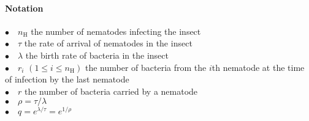 \documentclass{article}
\newcommand{\nN}{{n_\textrm{H}}}
\begin{document}
 \paragraph{Notation} $ $\\
 $\bullet \quad \nN$ the number of nematodes infecting the insect\\
 $\bullet \quad \tau$ the rate of arrival of nematodes in the insect\\
 $\bullet \quad \lambda$ the birth rate of bacteria in the insect\\
 $\bullet \quad r_i$ $( 1 \leq i \leq \nN )$ the number of bacteria from the $i$th nematode at the time of infection by the last nematode\\
 $\bullet \quad r$ the number of bacteria carried by a nematode \\
 $\bullet \quad \rho = \tau /  \lambda $ \\
 $\bullet \quad q=e^{ \lambda / \tau}=e^{ 1/ \rho}$
 
\end{document}
